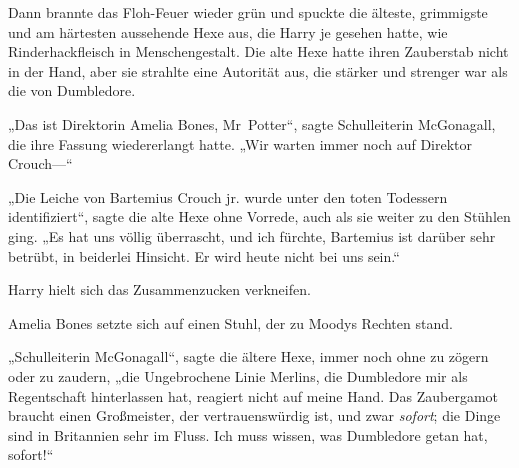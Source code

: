Dann brannte das Floh-Feuer wieder grün und spuckte die älteste, grimmigste und am härtesten aussehende Hexe aus, die Harry je gesehen hatte, wie Rinderhackfleisch in Menschengestalt. Die alte Hexe hatte ihren Zauberstab nicht in der Hand, aber sie strahlte eine Autorität aus, die stärker und strenger war als die von Dumbledore.

„Das ist Direktorin Amelia Bones, Mr~Potter“, sagte Schulleiterin McGonagall, die ihre Fassung wiedererlangt hatte. „Wir warten immer noch auf Direktor Crouch—“

„Die Leiche von Bartemius Crouch jr. wurde unter den toten Todessern identifiziert“, sagte die alte Hexe ohne Vorrede, auch als sie weiter zu den Stühlen ging.
„Es hat uns völlig überrascht, und ich fürchte, Bartemius ist darüber sehr betrübt, in beiderlei Hinsicht. Er wird heute nicht bei uns sein.“

Harry hielt sich das Zusammenzucken verkneifen.

Amelia Bones setzte sich auf einen Stuhl, der zu Moodys Rechten stand.

„Schulleiterin McGonagall“, sagte die ältere Hexe, immer noch ohne zu zögern oder zu zaudern, „die Ungebrochene Linie Merlins, die Dumbledore mir als Regentschaft hinterlassen hat, reagiert nicht auf meine Hand. Das Zaubergamot braucht einen Großmeister, der vertrauenswürdig ist, und zwar \emph{sofort}; die Dinge sind in Britannien sehr im Fluss. Ich muss wissen, was Dumbledore getan hat, sofort!“

